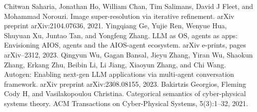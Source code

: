 \begin{chapterreferences}
 Chitwan Saharia, Jonathan Ho, William Chan, Tim Salimans, David J Fleet, and Mohammad Norouzi. Image super-resolution via iterative refinement. arXiv preprint arXiv:2104.07636, 2021.
 Yingqiang Ge, Yujie Ren, Wenyue Hua, Shuyuan Xu, Juntao Tan, and Yongfeng Zhang. LLM as OS, agents as apps: Envisioning AIOS, agents and the AIOS-agent ecosystem. arXiv e-prints, pages arXiv–2312, 2023.
 Qingyun Wu, Gagan Bansal, Jieyu Zhang, Yiran Wu, Shaokun Zhang, Erkang Zhu, Beibin Li, Li Jiang, Xiaoyun Zhang, and Chi Wang. Autogen: Enabling next-gen LLM applications via multi-agent conversation framework. arXiv preprint arXiv:2308.08155, 2023.
 Bakirtzis Georgios, Fleming Cody H, and Vasilakopoulou Christina. Categorical semantics of cyber-physical systems theory. ACM Transactions on Cyber-Physical Systems, 5(3):1–32, 2021.
\end{chapterreferences}
